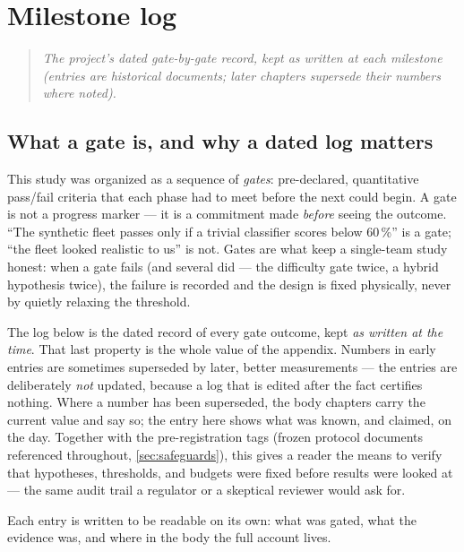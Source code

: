 \chapter{Milestone log}
\label{ch:milestones}

\begin{quote}\itshape
The project's dated gate-by-gate record, kept as written at each milestone (entries are
historical documents; later chapters supersede their numbers where noted).
\end{quote}

\section*{What a gate is, and why a dated log matters}

This study was organized as a sequence of \emph{gates}: pre-declared, quantitative
pass/fail criteria that each phase had to meet before the next could begin. A gate is not a
progress marker --- it is a commitment made \emph{before} seeing the outcome. ``The synthetic
fleet passes only if a trivial classifier scores below 60\,\%'' is a gate; ``the fleet looked
realistic to us'' is not. Gates are what keep a single-team study honest: when a gate fails
(and several did --- the difficulty gate twice, a hybrid hypothesis twice), the failure is
recorded and the design is fixed physically, never by quietly relaxing the threshold.

The log below is the dated record of every gate outcome, kept \emph{as written at the time}.
That last property is the whole value of the appendix. Numbers in early entries are sometimes
superseded by later, better measurements --- the entries are deliberately \emph{not} updated,
because a log that is edited after the fact certifies nothing. Where a number has been
superseded, the body chapters carry the current value and say so; the entry here shows what
was known, and claimed, on the day. Together with the pre-registration tags (frozen protocol
documents referenced throughout, \cref{sec:safeguards}), this gives a reader the means to verify
that hypotheses, thresholds, and budgets were fixed before results were looked at --- the
same audit trail a regulator or a skeptical reviewer would ask for.

Each entry is written to be readable on its own: what was gated, what the evidence was, and
where in the body the full account lives.

